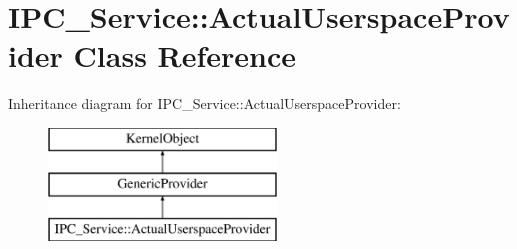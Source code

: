 \hypertarget{class_i_p_c___service_1_1_actual_userspace_provider}{}\section{I\+P\+C\+\_\+\+Service\+:\+:Actual\+Userspace\+Provider Class Reference}
\label{class_i_p_c___service_1_1_actual_userspace_provider}
Inheritance diagram for I\+P\+C\+\_\+\+Service\+:\+:Actual\+Userspace\+Provider\+:\begin{figure}[H]
\begin{center}
\leavevmode
\includegraphics[height=3.000000cm]{class_i_p_c___service_1_1_actual_userspace_provider}
\end{center}
\end{figure}
